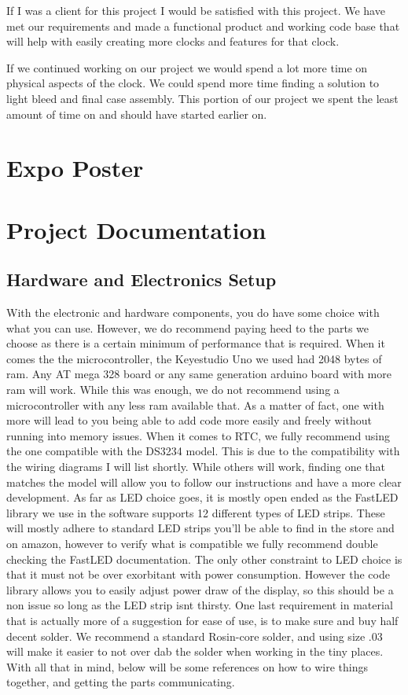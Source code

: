 \documentclass[onecolumn, draftclsnofoot,10pt, compsoc]{IEEEtran}
\begin{document}
If I was a client for this project I would be satisfied with this project. We have met our requirements and made a functional product and working code base that will help with easily creating more clocks and features for that clock.

If we continued working on our project we would spend a lot more time on physical aspects of the clock. We could spend more time finding a solution to light bleed and final case assembly. This portion of our project we spent the least amount of time on and should have started earlier on.

\section{Expo Poster}
\newpage

\section{Project Documentation}
\subsection{Hardware and Electronics Setup}
With the electronic and hardware components, you do have some choice with what you can use.
However, we do recommend paying heed to the parts we choose as there is a certain minimum of performance that is required.
When it comes the the microcontroller, the Keyestudio Uno we used had 2048 bytes of ram.
Any AT mega 328 board or any same generation arduino board with more ram will work.
While this was enough, we do not recommend using a microcontroller with any less ram available that.
As a matter of fact, one with more will lead to you being able to add code more easily and freely without running into memory issues.
When it comes to RTC, we fully recommend using the one compatible with the DS3234 model.
This is due to the compatibility with the wiring diagrams I will list shortly.
While others will work, finding one that matches the model will allow you to follow our instructions and have a more clear development.
As far as LED choice goes, it is mostly open ended as the FastLED library we use in the software supports 12 different types of LED strips.
These will mostly adhere to standard LED strips you'll be able to find in the store and on amazon, however to verify what is compatible we fully recommend double checking the FastLED documentation.
The only other constraint to LED choice is that it must not be over exorbitant with power consumption.
However the code library allows you to easily adjust power draw of the display, so this should be a non issue so long as the LED strip isnt thirsty.
One last requirement in material that is actually more of a suggestion for ease of use, is to make sure and buy half decent solder.
We recommend a standard Rosin-core solder, and using size .03 will make it easier to not over dab the solder when working in the tiny places.
With all that in mind, below will be some references on how to wire things together, and getting the parts communicating.
\end{document}
